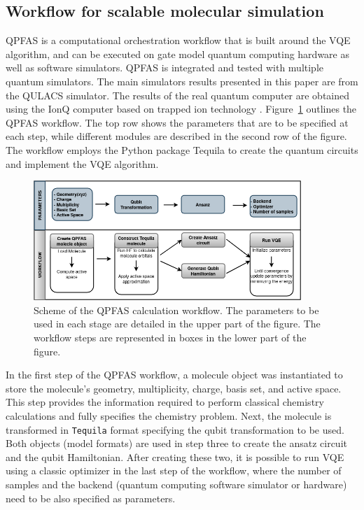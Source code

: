 \documentclass[journal,onecolumn]{IEEEtran}
\begin{document}
\subsection{Workflow for scalable molecular simulation}
\label{sec:workflow_for_scalable_molecular_simulation}
QPFAS is a computational orchestration workflow that is built around the VQE algorithm, and can be executed on gate model quantum computing hardware as well as software simulators. 
QPFAS is integrated and tested with multiple quantum simulators. 
The main simulators results presented in this paper are from the QULACS \cite{QULACS} simulator.
The results of the real quantum computer are obtained using the IonQ computer based on trapped ion technology \cite{ionq}. 
%
Figure~\ref{fig:workflow_steps} outlines the QPFAS workflow.
The top row shows the parameters that are to be specified at each step, while different modules are described in the second row of the figure. 
The workflow employs the Python package Tequila \cite{kottmann2021tequila} to create the quantum circuits and implement the VQE algorithm.

\begin{figure}[htb!]
  \centering
  \includegraphics[width=0.9\textwidth]{Figure_2.png}
  \caption{Scheme of the QPFAS calculation workflow. The parameters to be used in each stage are detailed in the upper part of the figure. The workflow steps are represented in boxes in the lower part of the figure. }
  \label{fig:workflow_steps}
\end{figure}

In the first step of the QPFAS workflow, a molecule object was instantiated to store the molecule's geometry, multiplicity, charge, basis set, and active space. 
This step provides the information required to perform classical chemistry calculations and fully specifies the chemistry problem. 
Next, the molecule is transformed in \texttt{Tequila} format\cite{kottmann2021tequila} specifying the qubit transformation to be used. 
Both objects (model formats) are used in step three to create the ansatz circuit and the qubit Hamiltonian. 
After creating these two, it is possible to run VQE using a classic optimizer in the last step of the workflow, where the number of samples and the backend (quantum computing software simulator or hardware) need to be also specified as parameters. 
\end{document}
